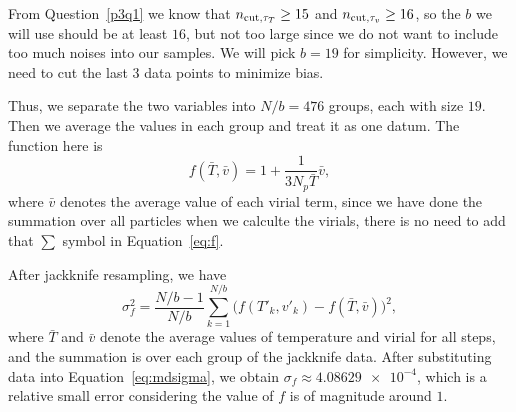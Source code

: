 From Question~\ref{p3q1} we know that
\(n_{\textnormal{cut}, \tau_T} \geq 15\) and
\(n_{\textnormal{cut}, \tau_v} \geq 16\), so the \(b\) we will use should be
at least \(16\), but not too large since we do not want to include too much noises
into our samples. We will pick \(b = 19\) for simplicity.
However, we need to cut the last \(3\) data points to minimize bias.

Thus, we separate the two variables into \(N / b = 476\) groups, each with
size \(19\). Then we average the values in each group and treat it as one datum.
The function here is
%
\begin{equation}\label{eq:f}
    f(\bar{T}, \bar{v}) = 1 + \frac{ 1 }{ 3N_p \bar{T} } \bar{v},
\end{equation}
%
where \(\bar{v}\) denotes the average value of each virial term, since we have done
the summation over all particles when we calculte the virials, there is no need to
add that \(\sum\) symbol in Equation~\eqref{eq:f}.

After jackknife resampling, we have
%
\begin{equation}\label{eq:mdsigma}
    \sigma^2_{f} = \frac{ N/b - 1 }{ N/b }
    \sum_{k=1}^{N/b} \bigl( f(T'_k, v'_k) - f(\bar{T}, \bar{v}) \bigr)^2,
\end{equation}
%
where \(\bar{T}\) and \(\bar{v}\) denote the average values of temperature and
virial for all steps, and the summation is over each group of the jackknife
data.
After substituting data into Equation~\eqref{eq:mdsigma}, we obtain
\(\sigma_{f} \approx \num{4.08629e-4}\), which is a relative small error considering
the value of \(f\) is of magnitude around \(1\).
